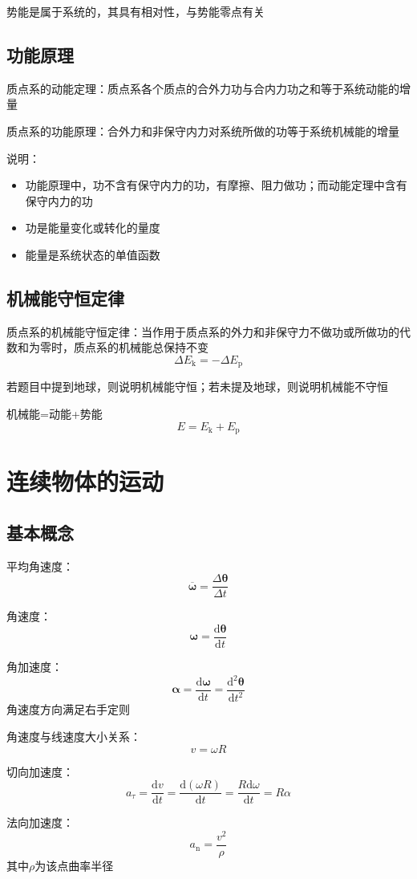 \documentclass[12pt, a4paper, twoside]{ctexbook}
\begin{document}
势能是属于系统的，其具有相对性，与势能零点有关
\section{功能原理}
{\sonti 质点系的动能定理}：质点系各个质点的合外力功与合内力功之和等于系统动能的增量

{\sonti 质点系的功能原理}：合外力和非保守内力对系统所做的功等于系统机械能的增量

{\sonti 说明}：
\begin{itemize}
    \item 功能原理中，功不含有保守内力的功，有摩擦、阻力做功；而动能定理中含有保守内力的功
    \item 功是能量变化或转化的量度
    \item 能量是系统状态的单值函数
\end{itemize}
\section{机械能守恒定律}
{\sonti 质点系的机械能守恒定律}：当作用于质点系的外力和非保守力不做功或所做功的代数和为零时，质点系的机械能总保持不变
$$
\Delta E_\mathrm{k}=-\Delta E_\mathrm{p}
$$

若题目中提到地球，则说明机械能守恒；若未提及地球，则说明机械能不守恒

机械能=动能+势能
$$
E=E_\mathrm{k}+E_\mathrm{p}
$$
\chapter{连续物体的运动}
\newpage
\section{基本概念}
{\sonti 平均角速度}：
$$
\overline{\boldsymbol{\omega}}=\frac{\Delta \boldsymbol{\theta}}{\Delta t}
$$

{\sonti 角速度}：
$$
\boldsymbol{\omega}=\frac{\mathrm{d}\boldsymbol{\theta}}{\mathrm{d}t}
$$

{\sonti 角加速度}：
$$
\boldsymbol{\alpha}=\frac{\mathrm{d}\boldsymbol{\omega}}{\mathrm{d}t}= \frac{\mathrm{d}^2\boldsymbol{\theta}}{\mathrm{d}t^2}
$$
角速度方向满足右手定则

{\sonti 角速度与线速度大小关系}：
$$
v=\omega R
$$

{\sonti 切向加速度}：
$$
a_\tau=\frac{\mathrm{d}v}{\mathrm{d}t}=\frac{\mathrm{d}\left(\omega R\right)}{\mathrm{d}t}=\frac{R\mathrm{d}\omega}{\mathrm{d}t}=R\alpha
$$

{\sonti 法向加速度}：
$$
a_\mathrm{n}=\frac{v^2}{\rho}
$$
其中$\rho$为该点曲率半径
\end{document}
